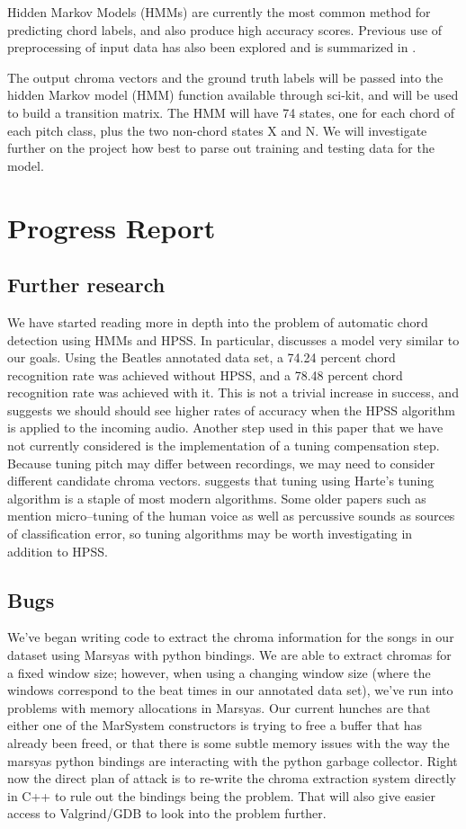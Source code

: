 \documentclass{article}
\begin{document}
Hidden Markov Models (HMMs) are currently the most common method for predicting
chord labels, and also produce high accuracy scores. Previous use of
preprocessing of input data has also been explored and is summarized in
\cite{McVicar:00}.

The output chroma vectors and the ground truth labels will be passed into the
hidden Markov model (HMM) function available through sci-kit, and will be used
to build a transition matrix. The HMM will have 74 states, one for each chord
of each pitch class, plus the two non-chord states X and N. We will investigate
further on the project how best to parse out training and testing data for the
model.

\section{Progress Report}\label{sec:progreport}

\subsection{Further research}
We have started reading more in depth into the problem of automatic chord
detection using HMMs and HPSS. In particular, \cite{Ueda:19} discusses a model
very similar to our goals.  Using the Beatles annotated data set, a 74.24
percent chord recognition rate was achieved without HPSS, and a 78.48 percent
chord recognition rate was achieved with it. This is not a trivial increase in
success, and suggests we should should see higher rates of accuracy when the
HPSS algorithm is applied to the incoming audio. Another step used in this
paper that we have not currently considered is the implementation of a tuning
compensation step. Because tuning pitch may differ between recordings, we may
need to consider different candidate chroma vectors.  \cite{McVicar:00}
suggests that tuning using Harte's tuning algorithm is a staple of most modern
algorithms.  Some older papers such as \cite{Zenz:20} mention micro--tuning of
the human voice as well as percussive sounds as sources of classification
error, so tuning algorithms may be worth investigating in addition to HPSS.

\subsection{Bugs}
We've began writing code to extract the chroma information for the songs in our
dataset using Marsyas with python bindings. We are able to extract chromas for
a fixed window size; however, when using a changing window size (where the
windows correspond to the beat times in our annotated data set), we've run into
problems with memory allocations in Marsyas. Our current hunches are that
either one of the MarSystem constructors is trying to free a buffer that has
already been freed, or that there is some subtle memory issues with the way the
marsyas python bindings are interacting with the python garbage collector.
Right now the direct plan of attack is to re-write the chroma extraction system
directly in C++ to rule out the bindings being the problem. That will also give
easier access to Valgrind/GDB to look into the problem further.
\end{document}
